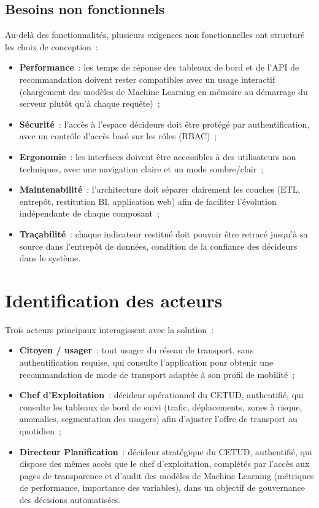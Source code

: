 \subsection{Besoins non fonctionnels}
Au-delà des fonctionnalités, plusieurs exigences non fonctionnelles ont structuré les choix de conception~:
\begin{itemize}
\item \textbf{Performance}~: les temps de réponse des tableaux de bord et de l'API de recommandation doivent rester compatibles avec un usage interactif (chargement des modèles de Machine Learning en mémoire au démarrage du serveur plutôt qu'à chaque requête)~;
\item \textbf{Sécurité}~: l'accès à l'espace décideurs doit être protégé par authentification, avec un contrôle d'accès basé sur les rôles (RBAC)~;
\item \textbf{Ergonomie}~: les interfaces doivent être accessibles à des utilisateurs non techniques, avec une navigation claire et un mode sombre/clair~;
\item \textbf{Maintenabilité}~: l'architecture doit séparer clairement les couches (ETL, entrepôt, restitution BI, application web) afin de faciliter l'évolution indépendante de chaque composant~;
\item \textbf{Traçabilité}~: chaque indicateur restitué doit pouvoir être retracé jusqu'à sa source dans l'entrepôt de données, condition de la confiance des décideurs dans le système.
\end{itemize}

\section{Identification des acteurs}
Trois acteurs principaux interagissent avec la solution~:

\begin{itemize}
\item \textbf{Citoyen / usager}~: tout usager du réseau de transport, sans authentification requise, qui consulte l'application pour obtenir une recommandation de mode de transport adaptée à son profil de mobilité~;
\item \textbf{Chef d'Exploitation}~: décideur opérationnel du CETUD, authentifié, qui consulte les tableaux de bord de suivi (trafic, déplacements, zones à risque, anomalies, segmentation des usagers) afin d'ajuster l'offre de transport au quotidien~;
\item \textbf{Directeur Planification}~: décideur stratégique du CETUD, authentifié, qui dispose des mêmes accès que le chef d'exploitation, complétés par l'accès aux pages de transparence et d'audit des modèles de Machine Learning (métriques de performance, importance des variables), dans un objectif de gouvernance des décisions automatisées.
\end{itemize}

